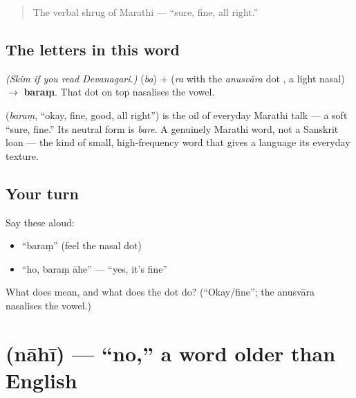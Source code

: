 \label{lesson:MR-C01-baram}



\begin{quote}
The verbal shrug of Marathi — \textquotedblleft{}sure, fine, all right.\textquotedblright{}
\end{quote}

\subsection*{The letters in this word}
\emph{(Skim if you read Devanagari.)} \textbf{} (\emph{ba}) + \textbf{} (\emph{ra} with the \emph{anusvāra} dot \textbf{}, a light nasal) $\to$ \textbf{baraṃ}. That dot on top nasalises the vowel.

\begin{cousinweb}
\textbf{} (\emph{baraṃ}, \textquotedblleft{}okay, fine, good, all right\textquotedblright{}) is the oil of everyday Marathi talk — a soft \textquotedblleft{}sure, fine.\textquotedblright{} Its neutral form is \emph{bare}. A genuinely Marathi word, not a Sanskrit loan — the kind of small, high-frequency word that gives a language its everyday texture.
\end{cousinweb}

\subsection*{Your turn}
Say these aloud:

\begin{itemize}
\raggedright
  \item \textquotedblleft{}baraṃ\textquotedblright{} (feel the nasal dot)
  \item \textquotedblleft{}ho, baraṃ āhe\textquotedblright{} — \textquotedblleft{}yes, it's fine\textquotedblright{}
\end{itemize}

\begin{tcolorbox}[breakable,colback=teal!4,colframe=teal!35!black,title={Before you move on}]
What does \textbf{} mean, and what does the dot \textbf{} do? (\textquotedblleft{}Okay/fine\textquotedblright{}; the anusvāra nasalises the vowel.)
\end{tcolorbox}
\section[nahi]{ (nāhī) — \textquotedblleft{}no,\textquotedblright{} a word older than English}

